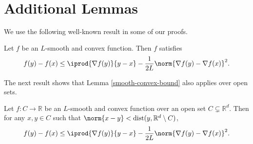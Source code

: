 \documentclass[10pt]{article} %
\newif\ifextended
\begin{document}
\fi

\section{Additional Lemmas}\label{additional-lemmas}
We use the following well-known result \cite[Lemma~5]{bubeck2015convex} in some of our proofs.
\begin{lemma}
    \label{smooth-convex-bound}
    Let $f$ be an $L$-smooth and convex function. Then $f$ satisfies
    \begin{align*}
        f(y) - f(x) \leq \iprod{\nabla f(y)}{y - x} - \frac{1}{2L}\norm{\nabla f(y) - \nabla f(x)}^2.
    \end{align*}
\end{lemma}
The next result \cite[Theorem~3.1]{drori2018properties} shows that Lemma \ref{smooth-convex-bound} also applies over open sets.
\begin{lemma}
    \label{smooth-convex-bound-subset}
    Let $f : C \rightarrow \mathbb{R}$ be an $L$-smooth and convex function over an open set $C \subsetneq \mathbb{R}^{d}$. Then for any $x, y \in C$ such that $\norm{x - y} < \text{dist}(y, \mathbb{R}^{d} \setminus C)$, 
    \begin{align*}
        f(y) - f(x) \leq \iprod{\nabla f(y)}{y - x} - \frac{1}{2L}\norm{\nabla f(y) - \nabla f(x)}^2.
    \end{align*}
\end{lemma}
\ifextended
The following lemma \cite[Lemma 3.5]{beck2013convergence} is used in our convex results.
\begin{lemma}
    \label{sequence-lemma}
    Let $\{A_{k}\}_{k \geq 0}$ be a non-negative sequence of real numbers satisfying
    \begin{equation*}
        A_{k} - A_{k + 1} \geq \gamma A_{k}^2,
    \end{equation*}
    for $k = 0, 1, \ldots$, and
    \begin{equation*}
        A_{0} \leq \frac{1}{m \gamma},
    \end{equation*}
    for positive $\gamma$ and $m$. Then 
    \begin{equation*}
        A_{k} \leq \frac{1}{\gamma}\frac{1}{k + m},
    \end{equation*}
    for $k = 0, 1, \ldots$.
\end{lemma}
\fi
\end{document}
